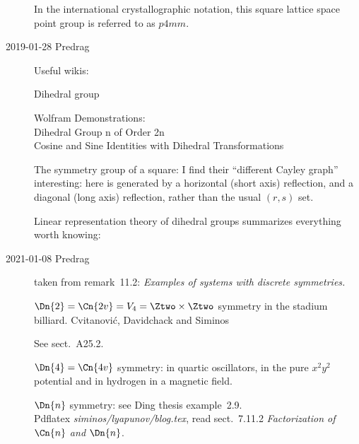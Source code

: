 \begin{description}
In the international crystallographic notation, this square lattice space
point group is referred to as $p4mm$.

\item[2019-01-28 Predrag]                                   \toCB
Useful wikis:

    {Dihedral group }

Wolfram Demonstrations:\\
{Dihedral Group n of Order 2n}
\\
{Cosine and Sine Identities with Dihedral Transformations}

{The symmetry group of a square}:
I find their ``different Cayley graph'' interesting:
here  is generated by a horizontal (short axis) reflection,
and a diagonal  (long axis)  reflection, rather than the usual $(r,s)$ set.

{Linear representation theory of dihedral groups} summarizes everything worth knowing:


\item[2021-01-08 Predrag] taken from
 {remark~11.2}:
{\em Examples of systems with discrete symmetries.}

$\Dn{2}=\Cn{2v} = V_4 =\Ztwo\times \Ztwo$ symmetry
in the stadium billiard.
Cvitanovi{\'c}, Davidchack  and Siminos

See  {sect.~A25.2}.

$\Dn{4}=\Cn{4v}$ symmetry: in quartic oscillators,
in the pure $x^2 y^2$ potential and
in hydrogen in a magnetic field.

$\Dn{n}$ symmetry: see
{Ding thesis example~2.9.}\\
Pdflatex \emph{siminos/lyapunov/blog.tex}, read sect.~7.11.2
\emph{Factorization of $\Cn{n}$ and $\Dn{n}$}.


\end{description}
